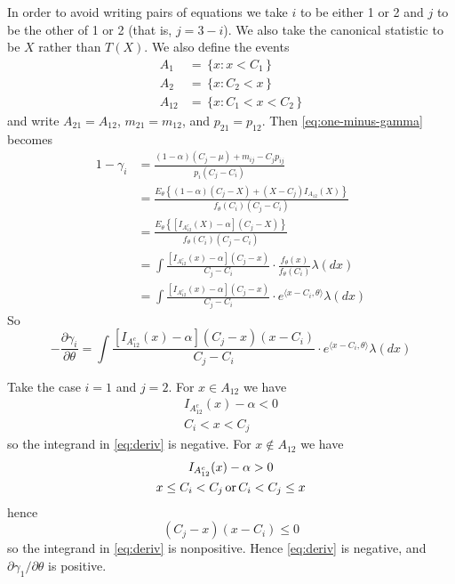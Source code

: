 \documentclass[11pt]{article}
\newcommand{\inner}[1]{\langle #1 \rangle}
\newcommand{\set}[1]{\,\{ #1 \,\}}
\newcommand{\opor}{\mathop{\rm or}}
\begin{document}
In order to avoid writing pairs of equations we take $i$ to be either 1 or 2
and $j$ to be the other of 1 or 2 (that is, $j = 3 - i$).
We also take the canonical statistic to be $X$ rather than $T(X)$.
We also define the events
\begin{align*}
   A_1 & = \set{ x : x < C_1 }
   \\
   A_2 & = \set{ x : C_2 < x }
   \\
   A_{1 2} & = \set{ x : C_1 < x < C_2 }
\end{align*}
and write $A_{2 1} = A_{1 2}$, $m_{2 1} = m_{1 2}$, and
$p_{2 1} = p_{1 2}$.  Then \eqref{eq:one-minus-gamma} becomes
\begin{align*}
   1 - \gamma_i
   & =
   \frac{(1 - \alpha) (C_j - \mu) + m_{i j} - C_j p_{i j}}
   {p_i (C_j - C_i)}
   \\
   & =
   \frac{ E_\theta \left\{ (1 - \alpha) (C_j - X) + (X - C_j) I_{A_{1 2}}(X)
   \right\}}
   {f_\theta(C_i) (C_j - C_i)}
   \\
   & =
   \frac{ E_\theta \left\{ [I_{A_{1 2}^c}(X) - \alpha] (C_j - X) \right\}}
   {f_\theta(C_i) (C_j - C_i)}
   \\
   & =
   \int
   \frac{[I_{A_{1 2}^c}(x) - \alpha] (C_j - x)}
   {C_j - C_i} \cdot \frac{f_\theta(x)}{f_\theta(C_i)} \lambda(d x)
   \\
   & =
   \int
   \frac{[I_{A_{1 2}^c}(x) - \alpha] (C_j - x)}
   {C_j - C_i} \cdot e^{\inner{x - C_i, \theta}} \lambda(d x)
\end{align*}
So
\begin{equation} \label{eq:deriv}
   - \frac{\partial \gamma_i}{\partial \theta} =
   \int
   \frac{[I_{A_{1 2}^c}(x) - \alpha] (C_j - x) (x - C_i)}
   {C_j - C_i} \cdot e^{\inner{x - C_i, \theta}} \lambda(d x)
\end{equation}

Take the case $i = 1$ and $j = 2$.
For $x \in A_{1 2}$ we have
\begin{gather*}
   I_{A_{1 2}^c}(x) - \alpha < 0
   \\
   C_i < x < C_j
\end{gather*}
so the integrand in \eqref{eq:deriv} is negative.
For $x \notin A_{1 2}$ we have
\begin{gather*}
   I_{A_{1 2}^c}(x) - \alpha > 0
   \\
   x \le C_i < C_j \opor C_i < C_j \le x
\end{gather*}
hence
$$
   (C_j - x) (x - C_i)  \le 0
$$
so the integrand in \eqref{eq:deriv} is nonpositive.
Hence \eqref{eq:deriv} is negative,
and $\partial \gamma_1 / \partial \theta$ is positive.
\end{document}

